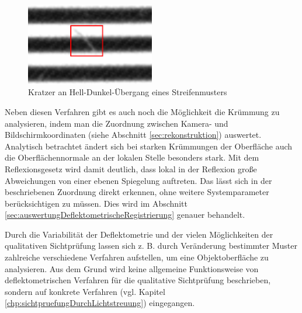 \begin{figure}[H]
	\centering
	\includegraphics[width=0.5\textwidth]{02_grundlagenZurDeflektometrie/qualitativeSichtpruefung/figures/scratch}
	\caption[Kratzer an Hell-Dunkel-Übergang eines Streifenmusters]{Kratzer an Hell-Dunkel-Übergang eines Streifenmusters}
	\label{img:scratch}
\end{figure}

\noindent
Neben diesen Verfahren gibt es auch noch die Möglichkeit die Krümmung zu analysieren, indem man die Zuordnung zwischen Kamera- und Bildschirmkoordinaten (siehe Abschnitt \ref{sec:rekonstruktion}) auswertet.
Analytisch betrachtet ändert sich bei starken Krümmungen der Oberfläche auch die Oberflächennormale an der lokalen Stelle besonders stark.
Mit dem Reflexionsgesetz wird damit deutlich, dass lokal in der Reflexion große Abweichungen von einer ebenen Spiegelung auftreten.
Das lässt sich in der beschriebenen Zuordnung direkt erkennen, ohne weitere Systemparameter berücksichtigen zu müssen.
Dies wird im Abschnitt \ref{sec:auswertungDeflektometrischeRegistrierung} genauer behandelt.

\p
Durch die Variabilität der Deflektometrie und der vielen Möglichkeiten der qualitativen Sichtprüfung lassen sich z. B. durch Veränderung bestimmter Muster zahlreiche verschiedene Verfahren aufstellen, um eine Objektoberfläche zu analysieren.
Aus dem Grund wird keine allgemeine Funktionsweise von deflektometrischen Verfahren für die qualitative Sichtprüfung beschrieben, sondern auf konkrete Verfahren (vgl. Kapitel \ref{chp:sichtpruefungDurchLichtstreuung}) eingegangen.